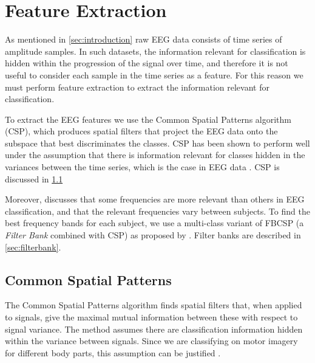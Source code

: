 \section{Feature Extraction}\label{sec:feature-extraction}
As mentioned in \cref{sec:introduction} raw EEG data consists of time series of amplitude samples. In such datasets, the information relevant for classification is hidden within the progression of the signal over time, and therefore it is not useful to consider each sample in the time series as a feature. For this reason we must perform feature extraction to extract the information relevant for classification. 

To extract the EEG features we use the Common Spatial Patterns algorithm (CSP), which produces spatial filters that project the EEG data onto the subspace that best discriminates the classes.
CSP has been shown to perform well under the assumption that there is information relevant for classes hidden in the variances between the time series, which is the case in EEG data \cite{ang2012filter}. CSP is discussed in \cref{sec:csp}

Moreover, \cite{ang2012filter} discusses that some frequencies are more relevant than others in EEG classification, and that the relevant frequencies vary between subjects. To find the best frequency bands for each subject, we use a multi-class variant of FBCSP (a \emph{Filter Bank} combined with CSP) as proposed by \citet{ang2012filter}. Filter banks are described in \cref{sec:filterbank}.

\subsection{Common Spatial Patterns}\label{sec:csp}
The Common Spatial Patterns algorithm finds spatial filters that, when applied to signals, give the maximal mutual information between these with respect to signal variance. The method assumes there are classification information hidden within the variance between signals. Since we are classifying on motor imagery for different body parts, this assumption can be justified \citep{blankertz2008optimizing}.

